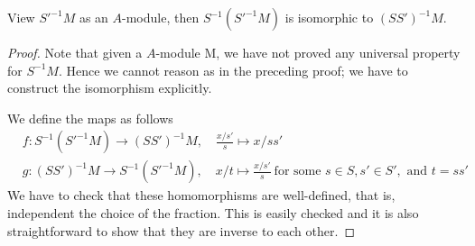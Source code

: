 \begin{proposition}
\label{proposition-localize-twice-module}
View $S'^{-1}M$ as an $A$-module, then $S^{-1}(S'^{-1}M)$ is
isomorphic to $(SS')^{-1}M$.
\end{proposition}

\begin{proof}
Note that given a $A$-module M, we have not proved any
universal property for $S^{-1}M$. Hence we cannot reason
as in the preceding proof; we have to construct the isomorphism explicitly.

\medskip\noindent
We define the maps as follows
\begin{align*}
& f : S^{-1}(S'^{-1}M) \longrightarrow (SS')^{-1}M, \quad \frac{x/s'}{s}\mapsto
x/ss'\\
& g : (SS')^{-1}M \longrightarrow S^{-1}(S'^{-1}M), \quad x/t\mapsto
\frac{x/s'}{s}\ \text{for some }s\in S, s'\in S', \text{ and }
t = ss'
\end{align*}
We have to check that these homomorphisms are well-defined, that is,
independent the choice of the fraction. This is easily checked and it is also
straightforward to show that they are inverse to each other.
\end{proof}